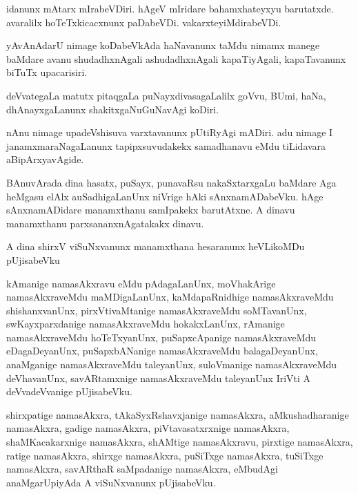 \documentclass{article}
\begin{document}
\begin{mn}
idanunx  mAtarx  mIrabeVDiri.  hAgeV  mIridare  bahamxhateyxyu  barutatxde.  avaralilx  
hoTeTxkicacxnunx  paDabeVDi.  vakarxteyiMdirabeVDi.
\end{mn}

\begin{mn}
yAvAnAdarU  nimage  koDabeVkAda  haNavanunx  taMdu  nimamx  manege  baMdare  avanu  
shudadhxnAgali  ashudadhxnAgali  kapaTiyAgali,  kapaTavanunx  biTuTx  upacarisiri.
\end{mn}

\begin{mn}
deVvategaLa  matutx  pitaqgaLa  puNayxdivasagaLalilx  goVvu,  BUmi,  haNa,  
dhAnayxgaLanunx  shakitxgaNuGuNavAgi  koDiri.
\end{mn}

\begin{mn}
nAnu  nimage  upadeVshisuva  varxtavanunx  pUtiRyAgi  mADiri.  adu  nimage  I  
janamxmaraNagaLanunx  tapipxsuvudakekx  samadhanavu  eMdu  tiLidavara  aBipArxyavAgide.  
\end{mn}

\begin{mn}
BAnuvArada  dina  hasatx,  puSayx,  punavaRsu  nakaSxtarxgaLu  baMdare  Aga  heMgasu  
elAlx  auSadhigaLanUnx  niVrige  hAki  sAnxnamADabeVku.  hAge  sAnxnamADidare  manamxthanu  
samIpakekx  barutAtxne.  A  dinavu  manamxthanu  parxsananxnAgatakakx  dinavu.
\end{mn}

\begin{mn}
A  dina  shirxV  viSuNxvanunx  manamxthana  hesaranunx  heVLikoMDu  pUjisabeVku
\end{mn}

\begin{mn}
kAmanige  namasAkxravu  eMdu  pAdagaLanUnx,  moVhakArige  namasAkxraveMdu  maMDigaLanUnx,  
kaMdapaRnidhige  namasAkxraveMdu  shishanxvanUnx,  pirxVtivaMtanige  namasAkxraveMdu  soMTavanUnx,  
swKayxparxdanige  namasAkxraveMdu  hokakxLanUnx,  rAmanige  namasAkxraveMdu  hoTeTxyanUnx,  
puSapxcApanige  namasAkxraveMdu  eDagaDeyanUnx,  puSapxbANanige  namasAkxraveMdu  balagaDeyanUnx,  
anaMganige  namasAkxraveMdu  taleyanUnx,  suloVmanige  namasAkxraveMdu  deVhavanUnx,  savARtamxnige  
namasAkxraveMdu  taleyanUnx  IriVti  A  deVvadeVvanige  pUjisabeVku.  
\end{mn}

\begin{mn}
shirxpatige  namasAkxra,  tAkaSyxRshavxjanige  namasAkxra,  aMkushadharanige  namasAkxra,  gadige  
namasAkxra,  piVtavasatxrxnige  namasAkxra,  shaMKacakarxnige  namasAkxra,  shAMtige  namasAkxravu,  
pirxtige  namasAkxra,  ratige  namasAkxra,  shirxge  namasAkxra,  puSiTxge  namasAkxra,  tuSiTxge  
namasAkxra,  savARthaR saMpadanige  namasAkxra,  eMbudAgi  anaMgarUpiyAda  A  viSuNxvanunx  pUjisabeVku.
\end{mn}
\end{document}

